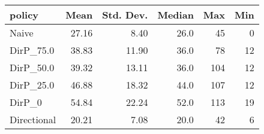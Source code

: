 \begin{tabular}{lrrrrr}
\toprule
     policy &  Mean &  Std. Dev. &  Median &  Max &  Min \\
\midrule
      Naive & 27.16 &       8.40 &    26.0 &   45 &    0 \\
  DirP\_75.0 & 38.83 &      11.90 &    36.0 &   78 &   12 \\
  DirP\_50.0 & 39.32 &      13.11 &    36.0 &  104 &   12 \\
  DirP\_25.0 & 46.88 &      18.32 &    44.0 &  107 &   12 \\
     DirP\_0 & 54.84 &      22.24 &    52.0 &  113 &   19 \\
Directional & 20.21 &       7.08 &    20.0 &   42 &    6 \\
\bottomrule
\end{tabular}
